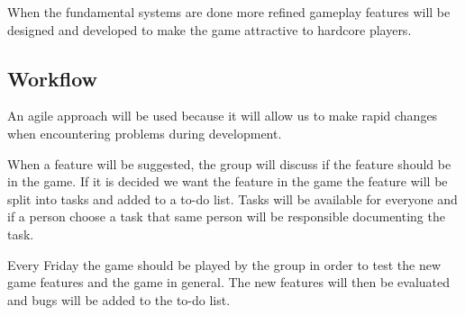 When the fundamental systems are done more refined gameplay features will be designed and developed to make the game attractive to hardcore players.

\subsection{Workflow}
An agile approach will be used because it will allow us to make rapid changes when encountering problems during development.

When a feature will be suggested, the group will discuss if the feature should be in the game.
If it is decided we want the feature in the game the feature will be split into tasks and added to a to-do list.
Tasks will be available for everyone and if a person choose a task that same person will be responsible documenting the task.

Every Friday the game should be played by the group in order to test the new game features and the game in general.
The new features will then be evaluated and bugs will be added to the to-do list.

